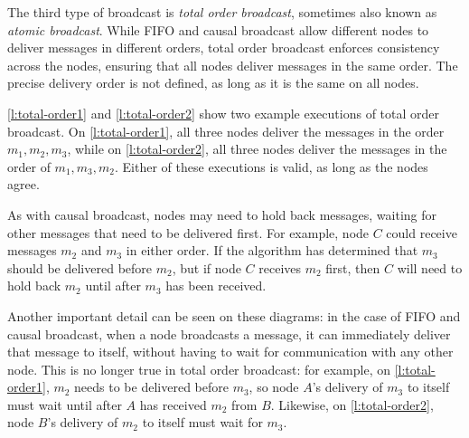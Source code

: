 The third type of broadcast is \emph{total order broadcast}, sometimes also known as \emph{atomic broadcast}.
While FIFO and causal broadcast allow different nodes to deliver messages in different orders, total order broadcast enforces consistency across the nodes, ensuring that all nodes deliver messages in the same order.
The precise delivery order is not defined, as long as it is the same on all nodes.

\autoref{l:total-order1} and \ref{l:total-order2} show two example executions of total order broadcast.
On \autoref{l:total-order1}, all three nodes deliver the messages in the order $m_1, m_2, m_3$, while on \autoref{l:total-order2}, all three nodes deliver the messages in the order of $m_1, m_3, m_2$.
Either of these executions is valid, as long as the nodes agree.

As with causal broadcast, nodes may need to hold back messages, waiting for other messages that need to be delivered first.
For example, node $C$ could receive messages $m_2$ and $m_3$ in either order.
If the algorithm has determined that $m_3$ should be delivered before $m_2$, but if node $C$ receives $m_2$ first, then $C$ will need to hold back $m_2$ until after $m_3$ has been received.

Another important detail can be seen on these diagrams: in the case of FIFO and causal broadcast, when a node broadcasts a message, it can immediately deliver that message to itself, without having to wait for communication with any other node.
This is no longer true in total order broadcast: for example, on \autoref{l:total-order1}, $m_2$ needs to be delivered before $m_3$, so node $A$'s delivery of $m_3$ to itself must wait until after $A$ has received $m_2$ from $B$.
Likewise, on \autoref{l:total-order2}, node $B$'s delivery of $m_2$ to itself must wait for $m_3$.

